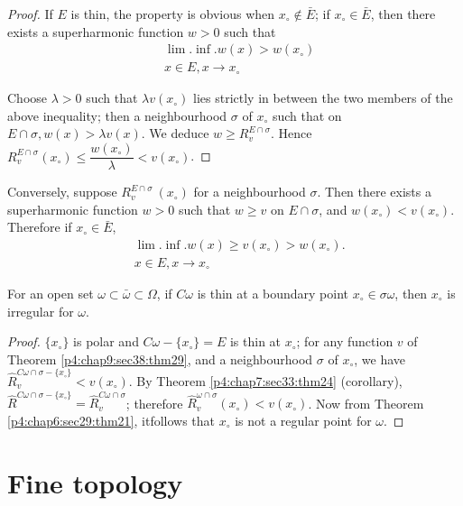 \begin{proof} %
  If $E$ is thin, the property is obvious when $x_\circ \notin \bar{E}$;
  if $x_\circ \in \bar{E}$, then there exists a superharmonic function $w
  > 0$ such that 
  \begin{align*}
    & \lim. \inf. w(x) > w (x_\circ)\\
    & x \in E, x \to x_\circ
  \end{align*} 
  
  Choose $\lambda > 0$ such that $\lambda v(x_\circ)$ lies strictly in
  between the two members of the above inequality; then a
  neighbourhood $\sigma$ of $x_\circ$ such that on $E \cap \sigma,
  w(x) > \lambda v(x)$. We deduce $w \ge R^{E \cap \sigma}_v$. Hence
  $R^{E \cap \sigma}_v (x_\circ) \le \dfrac{w (x_\circ)}{\lambda} < v
  (x_\circ)$. 
\end{proof}
 
Conversely, suppose $R^{E \cap \sigma}_v ~ (x_\circ)$ for a
neighbourhood $\sigma$. Then there exists a superharmonic function
$w > 0$ such that $w \ge v$ on $E \cap \sigma$, and $w(x_\circ) < v
(x_\circ)$. Therefore if $x_\circ \in \bar{E}$, 
\begin{align*}
  & \lim. \inf. w(x) \ge v(x_\circ) > w(x_\circ).\\
  & x \in E, x \to x_\circ
\end{align*}

\begin{prop}\label{p4:chap9:sec38:prop25} %
  For an open set $\omega \subset \bar{\omega} \subset \Omega$, if $C
  \omega$ is thin at a boundary point $x_\circ \in \sigma \omega$, then
  $x_\circ$ is irregular for $\omega$.  
\end{prop}

\begin{proof} %
  $\{x_\circ\}$ is polar and $C \omega - \{x_\circ \} =  E$ is thin at $x_\circ$;
  for any function $v$ of Theorem \ref{p4:chap9:sec38:thm29}, and a
  neighbourhood $\sigma$ 
  of $x_\circ$, we have $\hat{R}^{C \omega \cap \sigma - \{x_\circ\}}_v <
  v(x_\circ)$. By Theorem \ref{p4:chap7:sec33:thm24} (corollary),
  $\hat{R}^{C \omega \cap 
    \sigma- \{x_\circ\}} = \hat{R}^{C \omega \cap \sigma}_v$;
  therefore $\hat{R}_v^{\omega \cap \sigma} (x_\circ) < v(x_\circ)$. Now
  from Theorem \ref{p4:chap6:sec29:thm21}, it\pageoriginale follows that $x_\circ$ is
  not a regular point for $\omega$. 
\end{proof} 
 
\section{Fine topology}\label{p4:chap9:sec39}%


